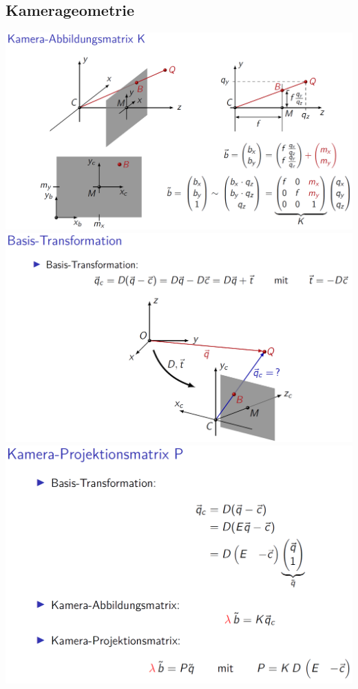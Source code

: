 		 
		\subsection{Kamerageometrie}		 
		 \includegraphics[width=0.9\linewidth]{Bilder/kamera1} \\
		 
		 \includegraphics[width=0.9\linewidth]{Bilder/kamera2} \\
		 
		 \includegraphics[width=0.9\linewidth]{Bilder/kamera3} \\
		 
